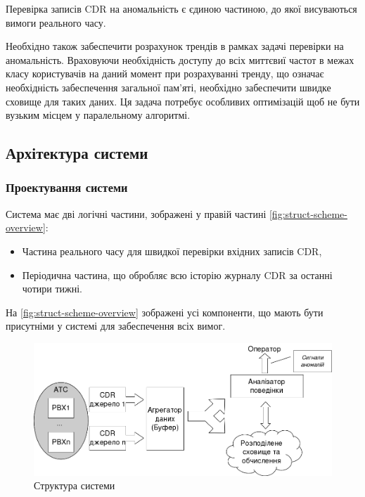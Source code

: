 Перевірка записів CDR на аномальність є єдиною частиною, до якої висуваються вимоги реального часу.

Необхідно також забеспечити розрахунок трендів в рамках задачі перевірки на аномальність. Враховуючи необхідність доступу до всіх миттєвиї частот в межах класу користувачів на даний момент при розрахуванні тренду, що означає необхідність забеспечення загальної пам'яті, необхідно забеспечити швидке сховище для таких даних. Ця задача потребує особливих оптимізацій щоб не бути вузьким місцем у паралельному алгоритмі.

\subsection{Архітектура системи}

\subsubsection{Проектування системи}

Система має дві логічні частини, зображені у правій частині \autoref{fig:struct-scheme-overview}:
\begin{itemize}
\item Частина реального часу для швидкої перевірки вхідних записів CDR,
\item Періодична частина, що обробляє всю історію журналу CDR за останні чотири тижні. %
\end{itemize}

На \autoref{fig:struct-scheme-overview} зображені усі компоненти, що мають бути присутніми у системі для забеспечення всіх вимог.

\begin{figure}[h]
        \begin{center}
            \includegraphics[scale=0.65]{resources/struct-1.png}
        \end{center}
        \caption{Структура системи}
        \label{fig:struct-scheme-overview}
\end{figure}

